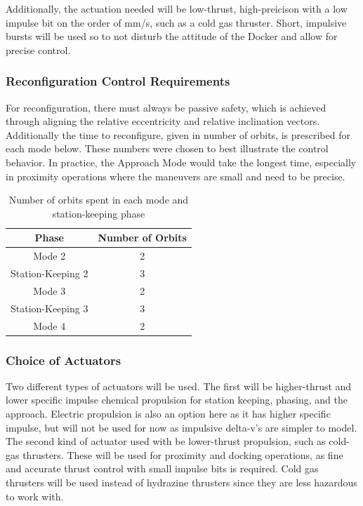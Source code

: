 Additionally, the actuation needed will be low-thrust, high-preicison with a low impulse bit on the order of mm/s, such as a cold gas thruster. Short, impulsive bursts will be used so to not disturb the attitude of the Docker and allow for precise control. 


\subsubsection{Reconfiguration Control Requirements}
For reconfiguration, there must always be passive safety, which is achieved through aligning the relative eccentricity and relative inclination vectors. Additionally the time to reconfigure, given in number of orbits, is prescribed for each mode below. These numbers were chosen to best illustrate the control behavior. In practice, the Approach Mode would take the longest time, especially in proximity operations where the maneuvers are small and need to be precise. 

\begin{table}[h!]
\centering
\begin{tabular}{|c|c|}
\hline
\textbf{Phase} & \textbf{Number of Orbits} \\
\hline
Mode 2 & 2 \\
Station-Keeping 2 & 3 \\
Mode 3 & 2 \\
Station-Keeping 3 & 3 \\
Mode 4 & 2 \\
\hline
\end{tabular}
\caption{Number of orbits spent in each mode and station-keeping phase}
\end{table}

\subsubsection{Choice of Actuators}
Two different types of actuators will be used. The first will be higher-thrust and lower specific impulse chemical propulsion for station keeping, phasing, and the approach. Electric propulsion is also an option here as it has higher specific impulse, but will not be used for now as impulsive delta-v's are simpler to model. The second kind of actuator used with be lower-thrust propulsion, such as cold-gas thrusters. These will be used for proximity and docking operations, as fine and accurate thrust control with small impulse bits is required. Cold gas thrusters will be used instead of hydrazine thrusters since they are less hazardous to work with. 

